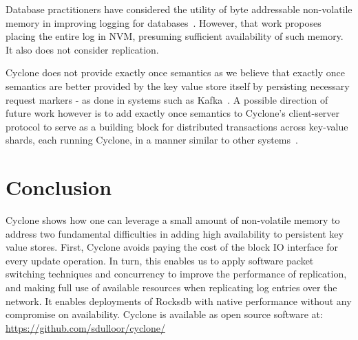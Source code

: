 \documentclass[letterpaper,twocolumn,10pt]{article}
\begin{document}

Database practitioners have considered the utility of byte addressable
non-volatile memory in improving logging for
databases~\cite{nvram_log}. However, that work proposes placing the
entire log in NVM, presuming sufficient availability of such
memory. It also does not consider replication.

Cyclone does not provide exactly once semantics as we believe that
exactly once semantics are better provided by the key value store
itself by persisting necessary request markers - as done in systems
such as Kafka~\cite{kafka}. A possible direction of future work
however is to add exactly once semantics to Cyclone's client-server
protocol to serve as a building block for distributed transactions
across key-value shards, each running Cyclone, in a manner similar to
other systems~\cite{raft_lin}.

\section{Conclusion}
Cyclone shows how one can leverage a small amount of non-volatile
memory to address two fundamental difficulties in adding high
availability to persistent key value stores. First, Cyclone avoids
paying the cost of the block IO interface for every update
operation. In turn, this enables us to apply software packet
switching techniques and concurrency to improve the performance of
replication, and making full use of available resources when
replicating log entries over the network. It enables deployments of
Rocksdb with native performance without any compromise on availability.
Cyclone is available as open source software at:\\
\url{https://github.com/sdulloor/cyclone/}
\newcommand\myurl[2]{\url{#1}}


\end{document}
